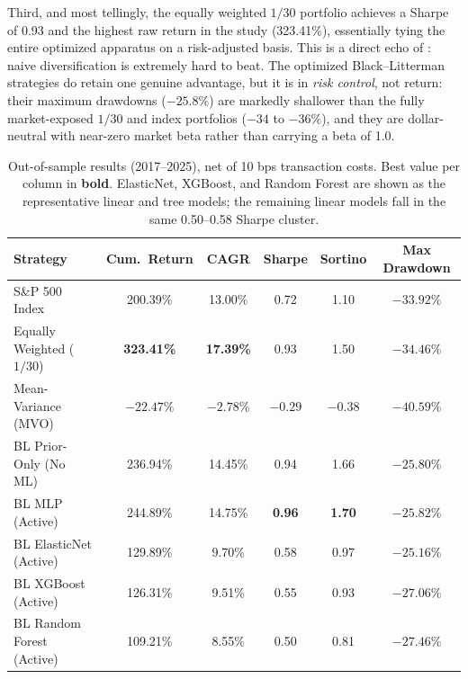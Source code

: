 \documentclass[11pt]{article}
\begin{document}
Third, and most tellingly, the equally weighted $1/30$ portfolio achieves a Sharpe of 0.93 and the
highest raw return in the study (323.41\%), essentially tying the entire optimized apparatus on a
risk-adjusted basis. This is a direct echo of \citet{demiguel2009optimal}: naive diversification
is extremely hard to beat. The optimized Black--Litterman strategies do retain one genuine
advantage, but it is in \emph{risk control}, not return: their maximum drawdowns ($-25.8\%$) are
markedly shallower than the fully market-exposed $1/30$ and index portfolios ($-34$ to $-36\%$),
and they are dollar-neutral with near-zero market beta rather than carrying a beta of 1.0.

\begin{table}[t]
\centering
\caption{Out-of-sample results (2017--2025), net of 10 bps transaction costs. Best value per
column in \textbf{bold}. ElasticNet, XGBoost, and Random Forest are shown as the representative
linear and tree models; the remaining linear models fall in the same 0.50--0.58 Sharpe cluster.}
\label{tab:results}
\small
\begin{tabular}{lccccc}
\toprule
Strategy & Cum.\ Return & CAGR & Sharpe & Sortino & Max Drawdown \\
\midrule
S\&P 500 Index            & 200.39\% & 13.00\% & 0.72 & 1.10 & $-33.92\%$ \\
Equally Weighted ($1/30$) & \textbf{323.41\%} & \textbf{17.39\%} & 0.93 & 1.50 & $-34.46\%$ \\
Mean-Variance (MVO)       & $-22.47\%$ & $-2.78\%$ & $-0.29$ & $-0.38$ & $-40.59\%$ \\
BL Prior-Only (No ML)     & 236.94\% & 14.45\% & 0.94 & 1.66 & $\mathbf{-25.80\%}$ \\
BL MLP (Active)           & 244.89\% & 14.75\% & \textbf{0.96} & \textbf{1.70} & $-25.82\%$ \\
BL ElasticNet (Active)    & 129.89\% & 9.70\% & 0.58 & 0.97 & $-25.16\%$ \\
BL XGBoost (Active)       & 126.31\% & 9.51\% & 0.55 & 0.93 & $-27.06\%$ \\
BL Random Forest (Active) & 109.21\% & 8.55\% & 0.50 & 0.81 & $-27.46\%$ \\
\bottomrule
\end{tabular}
\end{table}
\end{document}
